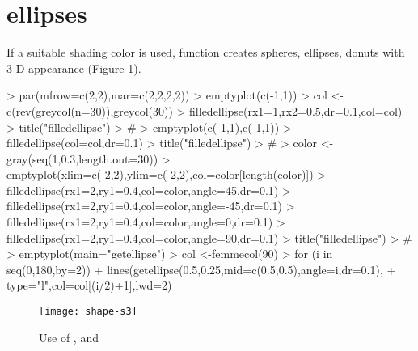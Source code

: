 \documentclass[article,nojss]{jss}
\begin{document}
\section{ellipses}
If a suitable shading color is used, function  creates spheres,
ellipses, donuts with 3-D appearance (Figure \ref{fig:s3}).
\begin{Schunk}
\begin{Sinput}
> par(mfrow=c(2,2),mar=c(2,2,2,2))
> emptyplot(c(-1,1))
> col  <- c(rev(greycol(n=30)),greycol(30))
> filledellipse(rx1=1,rx2=0.5,dr=0.1,col=col)
> title("filledellipse")
> #
> emptyplot(c(-1,1),c(-1,1))
> filledellipse(col=col,dr=0.1)
> title("filledellipse")
> #
> color <-gray(seq(1,0.3,length.out=30))
> emptyplot(xlim=c(-2,2),ylim=c(-2,2),col=color[length(color)])
> filledellipse(rx1=2,ry1=0.4,col=color,angle=45,dr=0.1)
> filledellipse(rx1=2,ry1=0.4,col=color,angle=-45,dr=0.1)
> filledellipse(rx1=2,ry1=0.4,col=color,angle=0,dr=0.1)
> filledellipse(rx1=2,ry1=0.4,col=color,angle=90,dr=0.1)
> title("filledellipse")
> #
> emptyplot(main="getellipse")
> col <-femmecol(90)
> for (i in seq(0,180,by=2))
+     lines(getellipse(0.5,0.25,mid=c(0.5,0.5),angle=i,dr=0.1),
+           type="l",col=col[(i/2)+1],lwd=2)
\end{Sinput}
\end{Schunk}
\begin{figure}
\begin{center}
\texttt{[image: shape-s3]}
\end{center}
\caption{Use of , and }
\label{fig:s3}
\end{figure}
\end{document}

